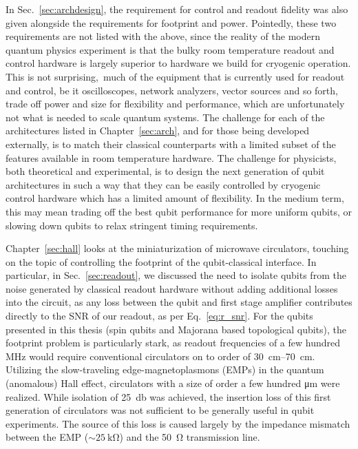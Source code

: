 In Sec.~\ref{sec:archdesign}, the requirement for control and readout fidelity was also given alongside the requirements for footprint and power. Pointedly,
these two requirements are not listed with the above, since the reality of the modern quantum physics experiment is that the bulky room temperature readout
and control hardware is largely superior to hardware we build for cryogenic operation. This is not surprising, much of the equipment that is currently used
for readout and control, be it oscilloscopes, network analyzers, vector sources and so forth, trade off power and size for flexibility and performance, which
are unfortunately not what is needed to scale quantum systems. The challenge for each of the architectures listed in Chapter~\ref{sec:arch}, and for those
being developed externally, is to match their classical counterparts with a limited subset of the features available in room temperature hardware.
The challenge for physicists, both theoretical and experimental, is to design the next generation of qubit architectures in such a way that they can be easily
controlled by cryogenic control hardware which has a limited amount of flexibility. In the medium term, this may mean trading off the best qubit performance
for more uniform qubits, or slowing down qubits to relax stringent timing requirements.

Chapter~\ref{sec:hall} looks at the miniaturization of microwave circulators, touching on the topic of controlling the footprint of the qubit-classical
interface. In particular, in Sec.~\ref{sec:readout}, we discussed the need to isolate qubits from the noise generated by classical readout hardware without
adding additional losses into the circuit, as any loss between the qubit and first stage amplifier contributes directly to the SNR of our readout, as per
Eq.~\ref{eq:r_snr}. For the qubits presented in this thesis (spin qubits and Majorana based topological qubits), the footprint problem is particularly
stark, as readout frequencies of a few hundred \si{\mega\hertz} would require conventional circulators on to order of \SIrange{30}{70}{\centi\meter}.
Utilizing the slow-traveling edge-magnetoplasmons (EMPs) in the quantum (anomalous) Hall effect, circulators with a size of order a few hundred \si{\micro\meter}
were realized. While isolation of \SI{25}{\decibel} was achieved, the insertion loss of this first generation of circulators was not sufficient to
be generally useful in qubit experiments. The source of this loss is caused largely by the impedance mismatch between the EMP ($\sim \SI{25}{\kilo\ohm}$) and the
\SI{50}{\ohm} transmission line.

